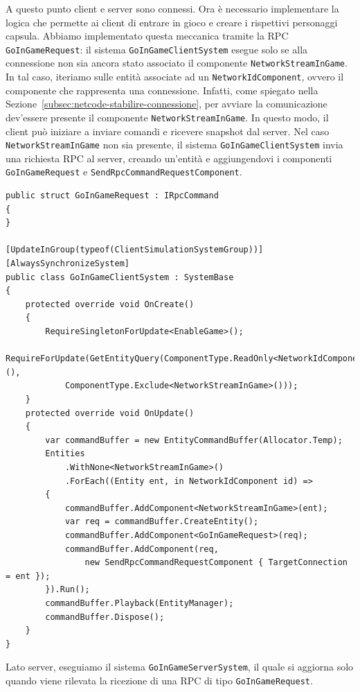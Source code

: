 A questo punto client e server sono connessi. Ora è necessario implementare la logica che permette ai client di entrare in gioco e creare i rispettivi personaggi capsula.
Abbiamo implementato questa meccanica tramite la RPC \verb|GoInGameRequest|: il sistema \verb|GoInGameClientSystem| esegue solo se alla connessione non sia ancora stato associato il componente \verb|NetworkStreamInGame|. In tal caso, iteriamo sulle entità associate ad un \verb|NetworkIdComponent|, ovvero il componente che rappresenta una connessione. Infatti, come spiegato nella Sezione~\ref{subsec:netcode-stabilire-connessione}, per avviare la comunicazione dev'essere presente il componente \verb|NetworkStreamInGame|. In questo modo, il client può iniziare a inviare comandi e ricevere snapshot dal server. Nel caso \verb|NetworkStreamInGame| non sia presente, il sistema \verb|GoInGameClientSystem| invia una richiesta RPC al server, creando un'entità e aggiungendovi i componenti \verb|GoInGameRequest| e \verb|SendRpcCommandRequestComponent|. 

\begin{lstlisting}[caption={File \UseVerb{GameTerm}: richiesta di ingresso in gioco del client.}, label={lst:prototipo-game-start-client}, language={[Sharp]C}]
public struct GoInGameRequest : IRpcCommand
{
}

[UpdateInGroup(typeof(ClientSimulationSystemGroup))]
[AlwaysSynchronizeSystem]
public class GoInGameClientSystem : SystemBase
{
    protected override void OnCreate()
    {
        RequireSingletonForUpdate<EnableGame>();
        RequireForUpdate(GetEntityQuery(ComponentType.ReadOnly<NetworkIdComponent>(),
            ComponentType.Exclude<NetworkStreamInGame>()));
    }
    protected override void OnUpdate()
    {
        var commandBuffer = new EntityCommandBuffer(Allocator.Temp);
        Entities
            .WithNone<NetworkStreamInGame>()
            .ForEach((Entity ent, in NetworkIdComponent id) =>
        {
            commandBuffer.AddComponent<NetworkStreamInGame>(ent);
            var req = commandBuffer.CreateEntity();
            commandBuffer.AddComponent<GoInGameRequest>(req);
            commandBuffer.AddComponent(req, 
                new SendRpcCommandRequestComponent { TargetConnection = ent });
        }).Run();
        commandBuffer.Playback(EntityManager);
        commandBuffer.Dispose();
    }
}
\end{lstlisting}

Lato server, eseguiamo il sistema \verb|GoInGameServerSystem|, il quale si aggiorna solo quando viene rilevata la ricezione di una RPC di tipo \verb|GoInGameRequest|. 

